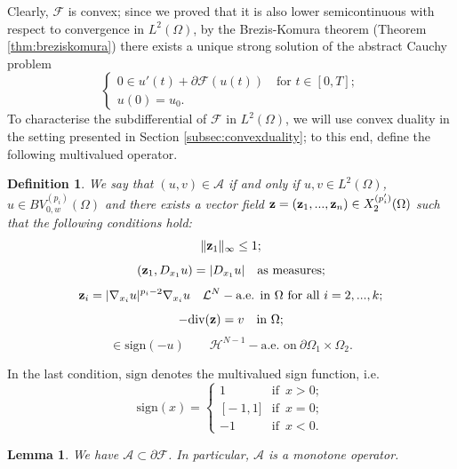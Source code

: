 \documentclass[reqno,12pt]{amsart}
\def\z{{\bf z}}
\newtheorem{lemma}[theorem]{Lemma}
\newtheorem{definition}[theorem]{Definition}
\numberwithin{equation}{section}
\newcommand{\threepartdef}[6]
{
	\left\{
	\begin{array}{lll}
		#1 & \mbox{if } #2 \\
		#3 & \mbox{if } #4 \\
		#5 & \mbox{if } #6
	\end{array}
	\right.
}
\begin{document}
Clearly, $\mathcal{F}$ is convex; since we proved that it is also lower semicontinuous with respect to convergence in $L^2(\Omega)$, by the Brezis-Komura theorem (Theorem \ref{thm:breziskomura}) there exists a unique strong solution of the abstract Cauchy problem
\begin{equation}\label{CPDirichlet}
\left\{ \begin{array}{ll} 0 \in u'(t) + \partial \mathcal{F}(u(t)) \quad \mbox{for } t \in [0,T]; \\[5pt] u(0) = u_0. \end{array}\right.
\end{equation}
To characterise the subdifferential of $\mathcal{F}$ in $L^2(\Omega)$, we will use convex duality in the setting presented in Section \ref{subsec:convexduality}; to this end, define the following multivalued operator.

\begin{definition}\label{dfn:operatorad}
{\rm We say that $(u,v) \in \mathcal{A}$ if and only if $u, v \in L^2(\Omega)$, $u \in BV_{0,w}^{(p_i)}(\Omega)$ and there exists a vector field $\z = (\z_1, ..., \z_n) \in X^{(p'_i)}_2(\Omega)$ such that the following conditions hold:
\begin{equation} 
\| \z_1 \|_\infty \leq 1;
\end{equation}
\begin{equation}
(\z_1, D_{x_1} u) = |D_{x_1} u| \quad \hbox{as measures};
\end{equation}
\begin{equation} 
\z_i = |\nabla_{x_i} u|^{p_i - 2} \nabla_{x_i} u \quad \mathcal{L}^N-\hbox{a.e. in } \Omega \hbox{ for all } i = 2,...,k;
\end{equation}
\begin{equation}
-\mathrm{div}(\z) = v \quad \hbox{in} \ \Omega;
\end{equation}
\begin{equation}
[\z_1, \nu_{x_1}] \in \mbox{sign}(-u) \qquad  \mathcal{H}^{N-1}-\mbox{a.e.  on} \ \partial \Omega_1 \times \Omega_2.
\end{equation}
}
\end{definition}

In the last condition, $\mbox{sign}$ denotes the multivalued sign function, i.e.
\begin{equation*}
\mbox{sign}(x) = \threepartdef{1}{\, x > 0;}{\, \mbox{[} -1,1 \mbox{]} }{\, x = 0;}{-1}{ \, x < 0.}
\end{equation*}

\begin{lemma}\label{lem:inclusion}
We have $\mathcal{A} \subset \partial \mathcal{F}$. In particular, $\mathcal{A}$ is a monotone operator.
\end{lemma}
\end{document}
